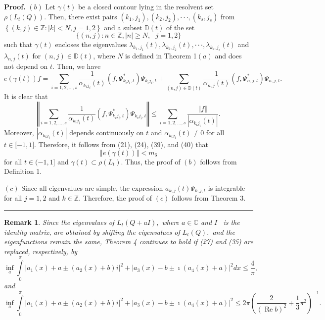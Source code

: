 \documentclass{article}%
\newtheorem{remark}{Remark}
\newenvironment{proof}[1][Proof]{\textbf{#1.} }{\ \rule{0.5em}{0.5em}}
\begin{document}
\begin{proof}
$(b)$ Let $\gamma(t)$ be a closed contour lying in the resolvent set
$\rho(L_{t}(Q)).$ Then, there exist pairs $(k_{1},j_{1}),(k_{2},j_{2}%
),\cdot\cdot\cdot,(k_{s},j_{s})$ from $\left\{  (k,j)\in\mathbb{Z}:\left\vert
k\right\vert <N,j=1,2\right\}  $ and a subset $\mathbb{D}(t)$ of the set
\[
\{(n,j):n\in\mathbb{Z},\mid n\mid\geq N,\text{ }j=1,2\}
\]
such that $\gamma(t)$ encloses the eigenvalues $\lambda_{k_{1},j_{1}%
}(t),\lambda_{k_{2},j_{2}}(t),\cdot\cdot\cdot,\lambda_{k_{s},j_{s}}(t)$ and
$\lambda_{n,j}(t)$ for $\left(  n,j\right)  \in\mathbb{D}(t)$, where $N$ is
defined in Theorem 1$(a)$ and does not depend on $t$. Then, we have
\begin{equation}
e(\gamma(t))f=%
{\textstyle\sum\limits_{i=1,2,...,s}}
\frac{1}{\alpha_{k_{i}j_{i}}(t)}(f,\Psi_{k_{i}j_{i},t}^{\ast})\Psi_{k_{i}%
j_{i},t}+%
{\textstyle\sum\limits_{\left(  n,j\right)  \in\mathbb{D}(t)}}
\frac{1}{\alpha_{n,j}(t)}(f,\Psi_{n,j,t}^{\ast})\Psi_{n,j,t}. \tag{39}%
\end{equation}
It is clear that
\begin{equation}
\left\Vert
{\textstyle\sum\limits_{i=1,2,...,s}}
\frac{1}{\alpha_{k_{i}j_{i}}(t)}(f,\Psi_{k_{i}j_{i},t}^{\ast})\Psi_{k_{i}%
j_{i},t}\right\Vert \leq%
{\textstyle\sum\limits_{i=1,2,...,s}}
\frac{\left\Vert f\right\Vert }{\left\vert \alpha_{k_{i}j_{i}}(t)\right\vert
}. \tag{40}%
\end{equation}
Moreover, $\left\vert \alpha_{k_{i}j_{i}}(t)\right\vert $ depends continuously
on $t$ and $\alpha_{k_{i}j_{i}}(t)\neq0$ for all $t\in\lbrack-1,1].$
Therefore, it follows from (21), (24), (39), and (40) that
\[
\left\Vert e(\gamma(t))\right\Vert <m_{6}%
\]
for all $t\in(-1,1]$ and $\gamma(t)\subset\rho\left(  L_{t}\right)  .$ Thus,
the proof of $(b)$ follows from Definition 1.

$(c)$ Since all eigenvalues are simple, the expression $a_{k,j}(t)\Psi
_{k,j,t}$ is integrable for all $j=1,2$ and $k\in\mathbb{Z}.$ Therefore, the
proof of $(c)$ follows from Theorem 3.
\end{proof}

\begin{remark}
Since the eigenvalues of $L_{t}(Q+aI),$ where $a\in\mathbb{C}$ and $I$ \ is
the identity matrix, are obtained by shifting the eigenvalues of $L_{t}(Q),$
and the eigenfunctions remain the same, Theorem 4 continues to hold if (27)
and (35) are replaced, respectively, by
\[
\inf_{a}\int\limits_{0}^{\pi}\left\vert a_{1}(x)+a\pm\left(  a_{2}%
(x)+b\right)  i\right\vert ^{2}+\left\vert a_{3}(x)-b\pm\imath(a_{4}%
(x)+a)\right\vert ^{2}dx\leq\frac{4}{\pi},
\]
and
\[
\inf_{a}\int\limits_{0}^{\pi}\left\vert a_{1}(x)+a\pm\left(  a_{2}%
(x)+b\right)  i\right\vert ^{2}+\left\vert a_{3}(x)-b\pm\imath(a_{4}%
(x)+a)\right\vert ^{2}\leq2\pi\left(  \frac{2}{\left(  \operatorname{Re}%
b\right)  ^{2}}+\frac{1}{3}\pi^{2}\right)  ^{-1}.
\]

\end{remark}
\end{document}
